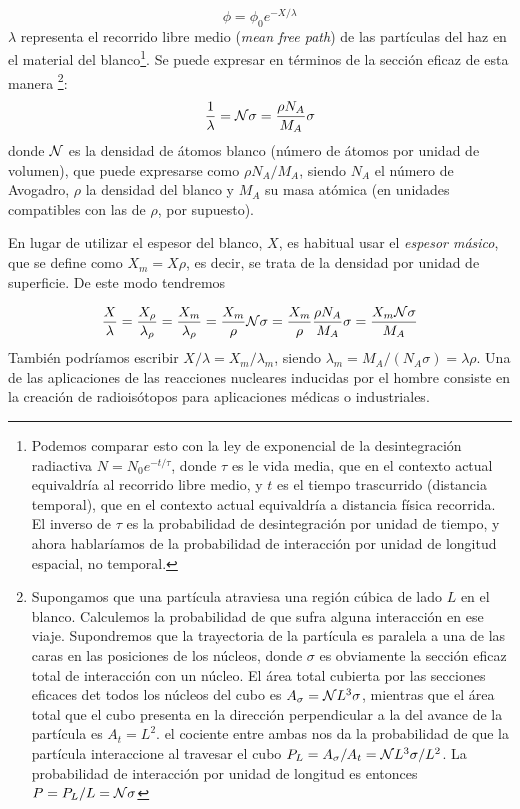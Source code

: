 \begin{equation}
    \phi = \phi_0 e^{-X/\lambda}
\end{equation}
$\lambda$ representa el recorrido libre medio (\textit{mean free path}) de las partículas del haz en el material del blanco\footnote{Podemos comparar esto con la ley de exponencial de la desintegración radiactiva $N=N_0 e^{-t/\tau}$, donde $\tau$ es le vida media, que en el contexto actual equivaldría al recorrido libre medio, y $t$ es el tiempo trascurrido (distancia temporal), que en el contexto actual equivaldría a distancia física recorrida. El inverso de $\tau$ es la probabilidad de desintegración por unidad de tiempo, y ahora hablaríamos de la probabilidad de interacción por unidad de longitud espacial, no temporal.}. Se puede expresar en términos de la sección eficaz de esta manera \footnote{Supongamos que una partícula atraviesa una región cúbica de lado $L$ en el blanco. Calculemos la probabilidad de que sufra alguna interacción en ese viaje. Supondremos que la trayectoria de la partícula es paralela a una de las caras en las posiciones de los núcleos, donde $\sigma$ es obviamente la sección eficaz total de interacción con un núcleo. El área total cubierta por las secciones eficaces det todos los núcleos del cubo es $A_\sigma = \mathcal{N} L^3 \sigma$, mientras que el área total que el cubo presenta en la dirección perpendicular a la del avance de la partícula es $A_t=L^2$. el cociente entre ambas nos da la probabilidad de que la partícula interaccione al travesar el cubo $P_L  = A_\sigma / A_t = \mathcal{N} L^3 \sigma / L^2$. La probabilidad de interacción por unidad de longitud es entonces $P=P_L/L=\mathcal{N} \sigma$}: \\

\begin{equation}
    \frac{1}{\lambda} = \mathcal{N} \sigma = \frac{\rho N_A }{M_A} \sigma 
\end{equation}
donde $\mathcal{N}$ es la densidad de átomos blanco (número de átomos por unidad de volumen), que puede expresarse como $\rho N_A /M_A$, siendo $N_A$ el número de Avogadro, $\rho$ la densidad del blanco y $M_A$ su masa atómica (en unidades compatibles con las de $\rho$, por supuesto). 

En lugar de utilizar el espesor del blanco, $X$, es habitual usar el \textit{espesor másico}, que se define como $X_m=X\rho$, es decir, se trata de la densidad por unidad de superficie. De este modo tendremos 

\begin{equation}
    \frac{X}{\lambda} = \frac{X_\rho}{\lambda_\rho} = \frac{X_m}{\lambda_\rho} = \frac{X_m}{\rho} \mathcal{N} \sigma = \frac{X_m}{\rho} \frac{\rho N_A}{M_A} \sigma = \frac{X_m \mathcal{N} \sigma}{M_A}
\end{equation}
También podríamos escribir $X/\lambda=X_m/\lambda_m$, siendo $\lambda_m = M_A /(N_A\sigma)=\lambda \rho$. Una de las aplicaciones de las reacciones nucleares inducidas por el hombre consiste en la creación de radioisótopos para aplicaciones médicas o industriales.


